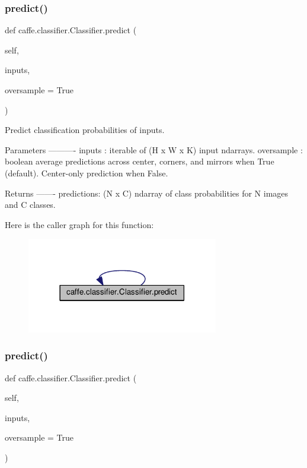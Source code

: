 \subsubsection{\texorpdfstring{predict()}{predict()}\hspace{0.1cm}{\footnotesize\ttfamily [1/2]}}
{\footnotesize\ttfamily def caffe.\+classifier.\+Classifier.\+predict (\begin{DoxyParamCaption}\item[{}]{self,  }\item[{}]{inputs,  }\item[{}]{oversample = {\ttfamily True} }\end{DoxyParamCaption})}

\begin{DoxyVerb}Predict classification probabilities of inputs.

Parameters
----------
inputs : iterable of (H x W x K) input ndarrays.
oversample : boolean
    average predictions across center, corners, and mirrors
    when True (default). Center-only prediction when False.

Returns
-------
predictions: (N x C) ndarray of class probabilities for N images and C
    classes.
\end{DoxyVerb}
 Here is the caller graph for this function\+:
\nopagebreak
\begin{figure}[H]
\begin{center}
\leavevmode
\includegraphics[width=237pt]{classcaffe_1_1classifier_1_1_classifier_a8d1d898b351cc84cd9f12ce10401312d_icgraph}
\end{center}
\end{figure}
\mbox{\label{classcaffe_1_1classifier_1_1_classifier_a8d1d898b351cc84cd9f12ce10401312d}} 
\subsubsection{\texorpdfstring{predict()}{predict()}\hspace{0.1cm}{\footnotesize\ttfamily [2/2]}}
{\footnotesize\ttfamily def caffe.\+classifier.\+Classifier.\+predict (\begin{DoxyParamCaption}\item[{}]{self,  }\item[{}]{inputs,  }\item[{}]{oversample = {\ttfamily True} }\end{DoxyParamCaption})}

